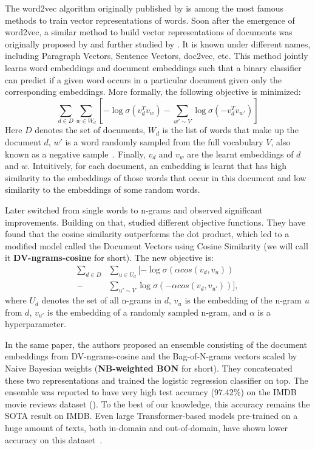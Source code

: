 \documentclass[11pt]{article}
\begin{document}
The word2vec algorithm originally published by \citet{mik_wordvec2013} is among the most famous methods to train vector representations of words. Soon after the emergence of word2vec, a similar method to build vector representations of documents was originally proposed by \citet{mik_docvec2014} and further studied by \citet{mes_2015}. It is known under different names, including Paragraph Vectors, Sentence Vectors, doc2vec, etc. This method jointly learns word embeddings and document embeddings such that a binary classifier can predict if a given word occurs in a particular document given only the corresponding embeddings. More formally, the following objective is minimized:
\begin{equation}
    \sum_{d\in D}\sum_{w\in W_d} [-\log\sigma (v_d^T v_w) - \sum_{w' \sim V} \log\sigma(-v_d^T v_{w'})]
\end{equation}
Here $D$ denotes the set of documents, $W_d$ is the list of words that make up the document $d$, $w'$ is a word randomly sampled from the full vocabulary $V$, also known as a negative sample~\citep{Goldberg_2014}. Finally, $v_d$ and $v_w$ are the learnt embeddings of $d$ and $w$. Intuitively, for each document, an embedding is learnt that has high similarity to the embeddings of those words that occur in this document and low similarity to the embeddings of some random words.

Later \citet{li_2016} switched from single words to n-grams and observed significant improvements. Building on that, \citet{thongtan-phienthrakul-2019-sentiment} studied different objective functions. They have found that the cosine similarity outperforms the dot product, which led to a modified model called the Document Vectors using Cosine Similarity (we will call it \textbf{DV-ngrams-cosine} for short). The new objective is:
\begin{equation}
\begin{aligned}
    \sum_{d\in D}&\sum_{u\in U_d} [-\log\sigma (\alpha cos(v_d, v_u))\\
    - &\sum_{u' \sim V} \log\sigma(-\alpha cos(v_d, v_{u'}))],
\end{aligned}
\end{equation}
where $U_d$ denotes the set of all n-grams in $d$, $v_u$ is the embedding of the n-gram $u$ from $d$, $v_{u'}$ is the embedding of a randomly sampled n-gram, and $\alpha$ is a hyperparameter.


In the same paper, the authors proposed an ensemble consisting of the document embeddings from DV-ngrams-cosine and the Bag-of-N-grams vectors scaled by Naive Bayesian weights (\textbf{NB-weighted BON} for short). They concatenated these two representations and trained the logistic regression classifier on top. The ensemble was reported to have very high test accuracy (97.42\%) on the IMDB movie reviews dataset (\citet{maas-etal-2011-learning}). To the best of our knowledge, this accuracy remains the SOTA result on IMDB. Even large Transformer-based models pre-trained on a huge amount of texts, both in-domain and out-of-domain, have shown lower accuracy on this dataset~\cite{yang2019xlnet,suchin2020,arefyev2021nb-mlm}.
\end{document}
